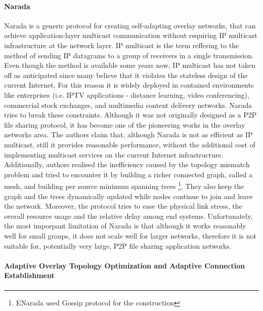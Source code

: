 \documentclass[acmcsur,acmnow]{acmtrans2m}
\begin{document}
\paragraph*{\bf Narada}

Narada \cite{chu_esm_2000,chu_esm_2001,chu_esm_2002} is a generic protocol for creating self-adapting overlay networks, that can achieve application-layer multicast communication without requiring IP multicast infrastructure at the network layer. IP multicast is the term reffering to the method of sending IP datagrams to a group of receivers in a single transmission. Even though the method is available some years now, IP multicast has not taken off as anticipated since many believe that it violates the stateless design of the current Internet. For this reason it is widely deployed in contained environments like enterprises (i.e. IPTV applications - distance learning, video conferencing), commercial stock exchanges, and multimedia content delivery networks. Narada tries to break these constraints. Although it was not originally designed as a P2P file sharing protocol, it has become one of the pioneering works in the overlay networks area. The authors claim that, although Narada is not as efficient as IP multicast, still it provides reasonable performance, without the additional cost of implementing multicast services on the current Internet infrastructure. Additionally, authors realised the inefficiency caused by the topology mismatch problem and tried to encounter it by building a richer connected graph, called a mesh, and building per source minimum spanning trees \footnote{ENarada \cite{li_enarada_2008} used Gossip protocol for the construction}. They also keep the
graph and the trees dynamically updated while nodes continue to join and leave the network. Moreover, the protocol tries to ease the physical link stress, the overall resource usage and the relative delay among end systems. Unfortunately, the most imporpant limitation of Narada is that although it works reasonably well for small groups, it does not scale well for larger networks, therefore it is not suitable for, potentially very large, P2P file sharing application networks.

\paragraph*{\bf Adaptive Overlay Topology Optimization and Adaptive Connection
Establishment}
\end{document}
